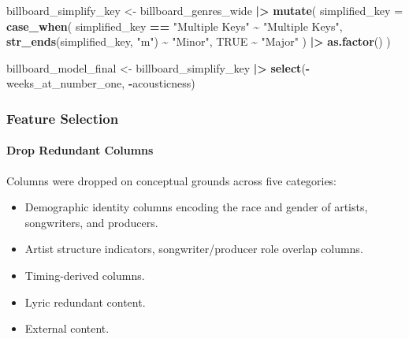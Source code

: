 \documentclass[
]{article}
\newenvironment{Shaded}{\begin{snugshade}}{\end{snugshade}}
\newcommand{\AttributeTok}[1]{\textcolor[rgb]{0.13,0.29,0.53}{#1}}
\newcommand{\ConstantTok}[1]{\textcolor[rgb]{0.56,0.35,0.01}{#1}}
\newcommand{\FunctionTok}[1]{\textcolor[rgb]{0.13,0.29,0.53}{\textbf{#1}}}
\newcommand{\NormalTok}[1]{#1}
\newcommand{\OtherTok}[1]{\textcolor[rgb]{0.56,0.35,0.01}{#1}}
\newcommand{\SpecialCharTok}[1]{\textcolor[rgb]{0.81,0.36,0.00}{\textbf{#1}}}
\newcommand{\StringTok}[1]{\textcolor[rgb]{0.31,0.60,0.02}{#1}}
\providecommand{\tightlist}{%
  \setlength{\itemsep}{0pt}\setlength{\parskip}{0pt}}
\begin{document}
\begin{Shaded}
\begin{Highlighting}[]
\NormalTok{billboard\_simplify\_key }\OtherTok{\textless{}{-}}\NormalTok{ billboard\_genres\_wide }\SpecialCharTok{|\textgreater{}} 
  \FunctionTok{mutate}\NormalTok{(}
    \AttributeTok{simplified\_key =} \FunctionTok{case\_when}\NormalTok{(}
\NormalTok{      simplified\_key }\SpecialCharTok{==} \StringTok{"Multiple Keys"}          \SpecialCharTok{\textasciitilde{}} \StringTok{"Multiple Keys"}\NormalTok{,}
      \FunctionTok{str\_ends}\NormalTok{(simplified\_key, }\StringTok{"m"}\NormalTok{)              }\SpecialCharTok{\textasciitilde{}} \StringTok{"Minor"}\NormalTok{,  }
      \ConstantTok{TRUE}                                        \SpecialCharTok{\textasciitilde{}} \StringTok{"Major"}  
\NormalTok{    ) }\SpecialCharTok{|\textgreater{}} \FunctionTok{as.factor}\NormalTok{()}
\NormalTok{  )}

\NormalTok{billboard\_model\_final }\OtherTok{\textless{}{-}}\NormalTok{ billboard\_simplify\_key }\SpecialCharTok{|\textgreater{}} 
  \FunctionTok{select}\NormalTok{(}\SpecialCharTok{{-}}\NormalTok{weeks\_at\_number\_one, }\SpecialCharTok{{-}}\NormalTok{acousticness)}
\end{Highlighting}
\end{Shaded}

\subsubsection{Feature Selection}\label{feature-selection}

\paragraph{Drop Redundant Columns}\label{drop-redundant-columns}

Columns were dropped on conceptual grounds across five categories:

\begin{itemize}
\tightlist
\item
  Demographic identity columns encoding the race and gender of artists,
  songwriters, and producers.
\item
  Artist structure indicators, songwriter/producer role overlap columns.
\item
  Timing-derived columns.
\item
  Lyric redundant content.
\item
  External content.
\end{itemize}
\end{document}
